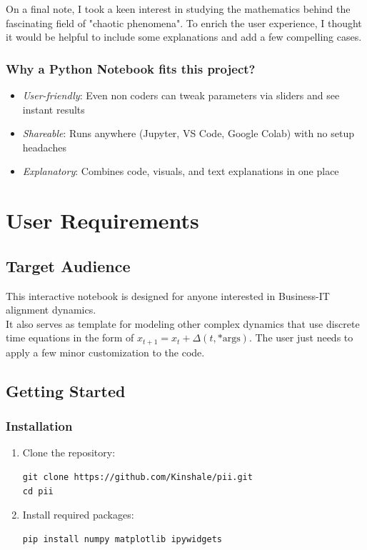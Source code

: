 \documentclass[a4paper, 10pt]{article}
\begin{document}
On a final note, I took a keen interest in studying the mathematics behind the fascinating field of "chaotic phenomena". 
To enrich the user experience, I thought it would be helpful to include some explanations and add a few compelling cases.

\subsubsection*{Why a Python Notebook fits this project?}

\begin{itemize}
    \item \textit{User-friendly}: Even non coders can tweak parameters via sliders and see instant results
    \item \textit{Shareable}: Runs anywhere (Jupyter, VS Code, Google Colab) with no setup headaches
    \item \textit{Explanatory}: Combines code, visuals, and text explanations in one place
\end{itemize}

\section{User Requirements}
\subsection{Target Audience}
This interactive notebook is designed for anyone interested in Business-IT alignment dynamics. \\
It also serves as template for modeling other complex dynamics that use discrete time equations in the form of $x_{t+1} = x_t + \Delta(t, \text{*args})$. The user just needs to apply a few minor customization to the code.

\subsection{Getting Started}
\subsubsection{Installation}
\begin{enumerate}
    \item Clone the repository:
    \begin{lstlisting}[style=bashstyle]
git clone https://github.com/Kinshale/pii.git
cd pii
    \end{lstlisting}

    \item Install required packages:
    \begin{lstlisting}[style=bashstyle]
pip install numpy matplotlib ipywidgets
    \end{lstlisting}
\end{enumerate}
\end{document}
